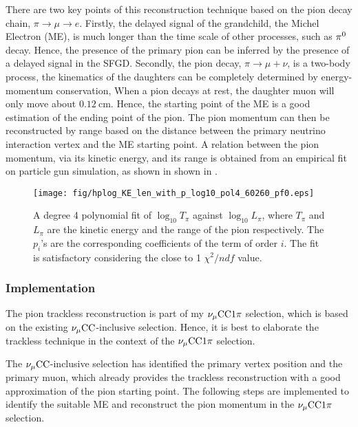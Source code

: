          There are two key points of this reconstruction technique based on the pion decay chain, $\pi \rightarrow \mu \rightarrow e$.
         Firstly, the delayed signal of the grandchild, the Michel Electron (ME), is much longer than the time scale of other processes, such as $\pi^0$ decay.
         Hence, the presence of the primary pion can be inferred by the presence of a delayed signal in the SFGD.
         Secondly, the pion decay, $\pi \rightarrow \mu + \nu$, is a two-body process, the kinematics of the daughters can be completely determined by energy-momentum conservation, 
         When a pion decays at rest, the daughter muon will only move about $0.12~\textrm{cm}$. Hence, the starting point of the ME is a good estimation of the ending point of the pion.
         The pion momentum can then be reconstructed by range based on the distance between the primary neutrino interaction vertex and the ME starting point. 
         A relation between the pion momentum, via its kinetic energy, and its range is obtained from an empirical fit on particle gun simulation, as shown in shown in .
        
           \begin{figure}[h]
              \centering
              \texttt{[image: fig/hplog\_KE\_len\_with\_p\_log10\_pol4\_60260\_pf0.eps]} 
              \caption{A degree 4 polynomial fit of $\log_{10}{T_\pi}$ against $\log_{10}{L_\pi}$, where $T_\pi$ and $L_\pi$ are the kinetic energy and the range of the pion respectively. The $p_i$'s are the corresponding coefficients of the term of order $i$. The fit is satisfactory considering the close to 1 $\chi^2/ndf$ value. }
              \label{fig:fit}
           \end{figure}

        \subsubsection{Implementation}
            The pion trackless reconstruction is part of my $\nu_{\mu}\textrm{CC}1\pi$ selection, which is based on the existing $\nu_{\mu}\textrm{CC}$-inclusive selection. Hence, it is best to elaborate the trackless technique in the context of the $\nu_{\mu}\textrm{CC}1\pi$ selection. 
        
            The $\nu_{\mu}\textrm{CC}$-inclusive selection has identified the primary vertex position and the primary muon, which already provides the trackless reconstruction with a good approximation of the pion starting point. The following steps are implemented to identify the suitable ME and reconstruct the pion momentum in the $\nu_{\mu}\textrm{CC}1\pi$ selection. 

